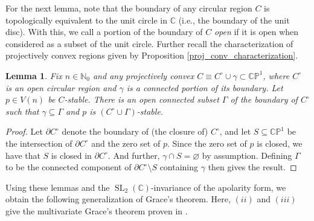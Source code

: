 \documentclass{article}
\newtheorem{lemma}[theorem]{Lemma}
\theoremstyle{definition}
\theoremstyle{plain}
\newcommand{\C}{\mathbb{C}}
\newcommand{\N}{\mathbb{N}}
\newcommand{\CP}{\mathbb{CP}}
\DeclareMathOperator{\SL}{SL}
\begin{document}
For the next lemma, note that the boundary of any circular region $C$ is topologically equivalent to the unit circle in $\C$ (i.e., the boundary of the unit disc). With this, we call a portion of the boundary of $C$ \emph{open} if it is open when considered as a subset of the unit circle. Further recall the characterization of projectively convex regions given by Proposition \ref{proj_conv_characterization}.

\begin{lemma} \label{proj_conv_open_boundary}
    Fix $n \in \N_0$ and any projectively convex $C \equiv C^\circ \cup \gamma \subset \CP^1$, where $C^\circ$ is an open circular region and $\gamma$ is a connected portion of its boundary. Let $p \in V(n)$ be $C$-stable. There is an open connected subset $\Gamma$ of the boundary of $C^\circ$ such that $\gamma \subseteq \Gamma$ and $p$ is $(C^\circ \cup \Gamma)$-stable.
\end{lemma}
\begin{proof}
    Let $\partial C^\circ$ denote the boundary of (the closure of) $C^\circ$, and let $S \subseteq \CP^1$ be the intersection of $\partial C^\circ$ and the zero set of $p$. Since the zero set of $p$ is closed, we have that $S$ is closed in $\partial C^\circ$. And further, $\gamma \cap S = \varnothing$ by assumption. Defining $\Gamma$ to be the connected component of $\partial C^\circ \setminus S$ containing $\gamma$ then gives the result.
\end{proof}

Using these lemmas and the $\SL_2(\C)$-invariance of the apolarity form, we obtain the following generalization of Grace's theorem. Here, $(ii)$ and $(iii)$ give the multivariate Grace's theorem proven in \cite{bb2}.
\end{document}
